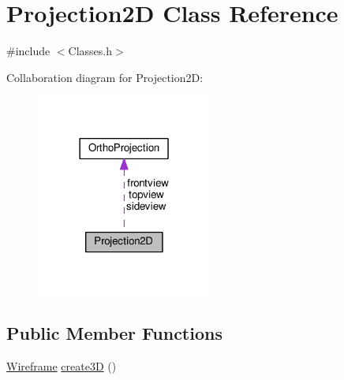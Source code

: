 \hypertarget{class_projection2_d}{}\section{Projection2D Class Reference}
\label{class_projection2_d}


{\ttfamily \#include $<$Classes.\+h$>$}



Collaboration diagram for Projection2D\+:\nopagebreak
\begin{figure}[H]
\begin{center}
\leavevmode
\includegraphics[width=165pt]{class_projection2_d__coll__graph}
\end{center}
\end{figure}
\subsection*{Public Member Functions}
\begin{DoxyCompactItemize}
\item 
\hyperlink{class_wireframe}{Wireframe} \hyperlink{class_projection2_d_aa061602930f19acad32720f7067c58fa}{create3D} ()
\end{DoxyCompactItemize}
